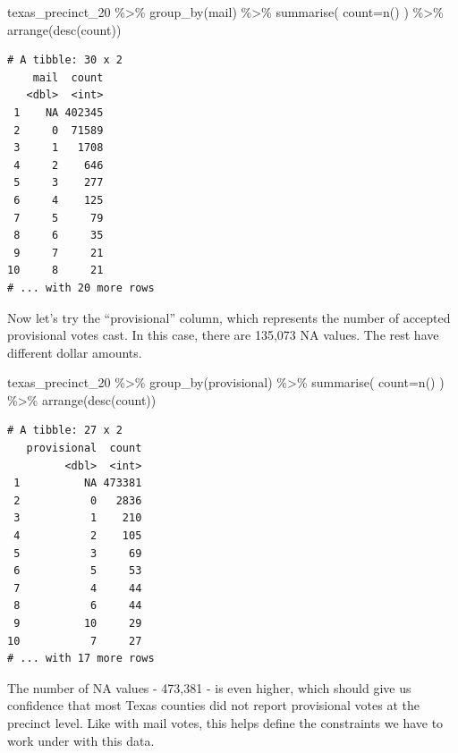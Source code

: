 \documentclass[
  letterpaper,
  DIV=11,
  numbers=noendperiod]{scrreprt}
\newenvironment{Shaded}{\begin{snugshade}}{\end{snugshade}}
\newcommand{\AttributeTok}[1]{\textcolor[rgb]{0.40,0.45,0.13}{#1}}
\newcommand{\FunctionTok}[1]{\textcolor[rgb]{0.28,0.35,0.67}{#1}}
\newcommand{\NormalTok}[1]{\textcolor[rgb]{0.00,0.23,0.31}{#1}}
\newcommand{\SpecialCharTok}[1]{\textcolor[rgb]{0.37,0.37,0.37}{#1}}
\begin{document}
\begin{Shaded}
\begin{Highlighting}[]
\NormalTok{texas\_precinct\_20 }\SpecialCharTok{\%\textgreater{}\%} 
  \FunctionTok{group\_by}\NormalTok{(mail) }\SpecialCharTok{\%\textgreater{}\%} 
  \FunctionTok{summarise}\NormalTok{(}
    \AttributeTok{count=}\FunctionTok{n}\NormalTok{()}
\NormalTok{  ) }\SpecialCharTok{\%\textgreater{}\%}
  \FunctionTok{arrange}\NormalTok{(}\FunctionTok{desc}\NormalTok{(count))}
\end{Highlighting}
\end{Shaded}

\begin{verbatim}
# A tibble: 30 x 2
    mail  count
   <dbl>  <int>
 1    NA 402345
 2     0  71589
 3     1   1708
 4     2    646
 5     3    277
 6     4    125
 7     5     79
 8     6     35
 9     7     21
10     8     21
# ... with 20 more rows
\end{verbatim}

Now let's try the ``provisional'' column, which represents the number of
accepted provisional votes cast. In this case, there are 135,073 NA
values. The rest have different dollar amounts.

\begin{Shaded}
\begin{Highlighting}[]
\NormalTok{texas\_precinct\_20 }\SpecialCharTok{\%\textgreater{}\%} 
  \FunctionTok{group\_by}\NormalTok{(provisional) }\SpecialCharTok{\%\textgreater{}\%} 
  \FunctionTok{summarise}\NormalTok{(}
    \AttributeTok{count=}\FunctionTok{n}\NormalTok{()}
\NormalTok{  ) }\SpecialCharTok{\%\textgreater{}\%}
  \FunctionTok{arrange}\NormalTok{(}\FunctionTok{desc}\NormalTok{(count))}
\end{Highlighting}
\end{Shaded}

\begin{verbatim}
# A tibble: 27 x 2
   provisional  count
         <dbl>  <int>
 1          NA 473381
 2           0   2836
 3           1    210
 4           2    105
 5           3     69
 6           5     53
 7           4     44
 8           6     44
 9          10     29
10           7     27
# ... with 17 more rows
\end{verbatim}

The number of NA values - 473,381 - is even higher, which should give us
confidence that most Texas counties did not report provisional votes at
the precinct level. Like with mail votes, this helps define the
constraints we have to work under with this data.
\end{document}

